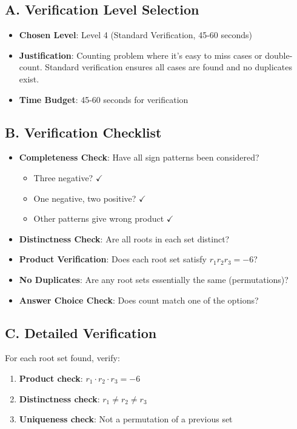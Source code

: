\documentclass[12pt]{article}
\begin{document}
\begin{verificationbox}
\subsection*{A. Verification Level Selection}
\begin{itemize}[leftmargin=*]
    \item \textbf{Chosen Level}: Level 4 (Standard Verification, 45-60 seconds)
    \item \textbf{Justification}: Counting problem where it's easy to miss cases or double-count. Standard verification ensures all cases are found and no duplicates exist.
    \item \textbf{Time Budget}: 45-60 seconds for verification
\end{itemize}

\subsection*{B. Verification Checklist}
\begin{itemize}[leftmargin=*]
    \item \textbf{Completeness Check}: Have all sign patterns been considered?
    \begin{itemize}
        \item Three negative? $\checkmark$
        \item One negative, two positive? $\checkmark$
        \item Other patterns give wrong product $\checkmark$
    \end{itemize}
    \item \textbf{Distinctness Check}: Are all roots in each set distinct?
    \item \textbf{Product Verification}: Does each root set satisfy $r_1 r_2 r_3 = -6$?
    \item \textbf{No Duplicates}: Are any root sets essentially the same (permutations)?
    \item \textbf{Answer Choice Check}: Does count match one of the options?
\end{itemize}

\subsection*{C. Detailed Verification}
For each root set found, verify:
\begin{enumerate}
    \item \textbf{Product check}: $r_1 \cdot r_2 \cdot r_3 = -6$
    \item \textbf{Distinctness check}: $r_1 \neq r_2 \neq r_3$
    \item \textbf{Uniqueness check}: Not a permutation of a previous set
\end{enumerate}
\end{verificationbox}
\end{document}
